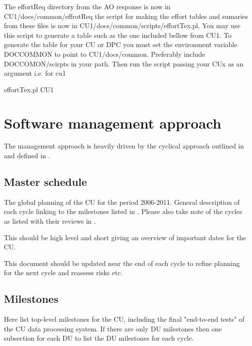 \documentclass[DM,lsstdraft,SDP]{lsstdoc}
\begin{document}
The effortReq directory from the AO response is now in CU1/docs/common/effrotReq
the script for making the effort tables and sumaries from these files is now
in CU1/docs/common/scripts/effortTex.pl. You may use this script to generate a
table such as the one included bellow from CU1. To generate the table for your
CU or DPC you must set the environment variable DOCCOMMON to point to
CU1/docs/common. Preferably include DOCCOMON/scirpts in your path. Then run the script
passing your CUx as an argument i.e. for cu1
\begin{code}
effortTex.pl CU1
\end{code}



\section{Software management approach} \label{sect:managemntapp}
The management approach is heavily driven by the cyclical approach outlined
in  and defined in .

\subsection{Master schedule } \label{sect:mastschedule}

The global planning of the CU for the period 2006-2011.
General description of each cycle linking to the  milestones
listed in .  Please also take note of the cycles
as listed with their reviews in .

This should be high level and short giving an overview of important dates for the CU.

This document should be updated near the end of each cycle to
refine planning for the next cycle and reassess risks etc.

\subsection{Milestones}
Here list top-level milestones for the CU, including the final "end-to-end tests" of the CU data processing system. If there are only DU milestones then
one subsection for each DU to list the DU milestones for each cycle.
\end{document}

